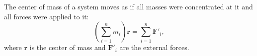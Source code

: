 The center of mass of a system moves as if all masses were concentrated at it and all forces were applied to it:
$$\left(\sum_{i=1}^{n} m_i\right) \ddot{\mathbf{r}} = \sum_{i=1}^{n} \mathbf{F}'_i,$$
where $\mathbf{r}$ is the center of mass and $\mathbf{F}'_i$ are the external forces.

